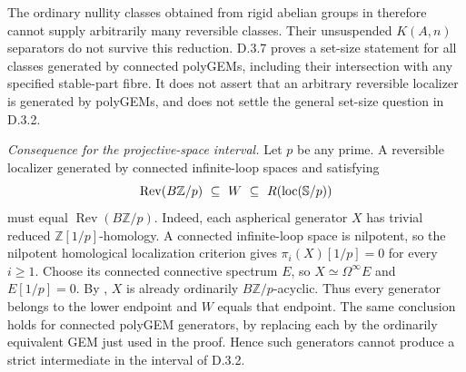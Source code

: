 The ordinary nullity classes obtained from rigid abelian groups in
\citet[Theorems~8.2 and~8.5]{FGHStanley2006} therefore cannot supply
arbitrarily many reversible classes.  Their unsuspended
$K(A,n)$ separators do not survive this reduction.  D.3.7 proves a
set-size statement for all classes generated by connected polyGEMs,
including their intersection with any specified stable-part fibre.
It does not assert that an arbitrary reversible localizer is
generated by polyGEMs, and does not settle the general set-size question
in D.3.2.

\medskip\noindent
\emph{Consequence for the projective-space interval.}
Let $p$ be any prime.  A reversible localizer generated by connected
infinite-loop spaces and satisfying
\[
 \operatorname{Rev}(B\mathbb Z/p)\ \subseteq\ W
          \ \subseteq\ R(\operatorname{loc}(\mathbb S/p))
\]
must equal $\operatorname{Rev}(B\mathbb Z/p)$.  Indeed, each
aspherical generator $X$ has trivial reduced
$\mathbb Z[1/p]$-homology.  A connected infinite-loop space is
nilpotent, so the nilpotent homological localization criterion
\citep[Theorems~6.1.1--6.1.2]{FGHMayPonto2012} gives
$\pi_i(X)[1/p]=0$ for every $i\geq1$.  Choose its connected
connective spectrum $E$, so $X\simeq\Omega^\infty E$ and
$E[1/p]=0$.  By \citet[Theorem~3.2]{EH5Levy2025}, $X$ is already
ordinarily $B\mathbb Z/p$-acyclic.  Thus every generator belongs
to the lower endpoint and $W$ equals that endpoint.  The same
conclusion holds for connected polyGEM generators, by replacing
each by the ordinarily equivalent GEM just used in the proof.
Hence such generators cannot produce a strict intermediate in
the interval of D.3.2.
